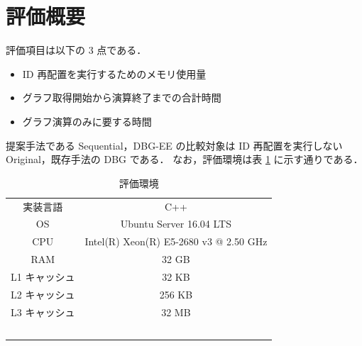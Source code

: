 \section{評価概要}
評価項目は以下の 3 点である．
\begin{itemize}
  \item ID 再配置を実行するためのメモリ使用量
  \item グラフ取得開始から演算終了までの合計時間 
  \item グラフ演算のみに要する時間
\end{itemize}
提案手法である Sequential，DBG-EE の比較対象は ID 再配置を実行しない Original，既存手法の DBG である．
なお，評価環境は表 \ref{eval_env} に示す通りである．
\begin{table}[t]
  \begin{center}
    \caption{評価環境}
    \begin{tabular}{cc} \toprule
      実装言語 & C++ \\
      OS & Ubuntu Server 16.04 LTS \\
      CPU & Intel(R) Xeon(R) E5-2680 v3 @ 2.50 GHz \\
      RAM & 32 GB \\
      L1 キャッシュ & 32 KB  \\
      L2 キャッシュ & 256 KB \\
      L3 キャッシュ & 32 MB \\ \bottomrule 
    \end{tabular}
    \label{eval_env}
  \end{center}
\end{table}

